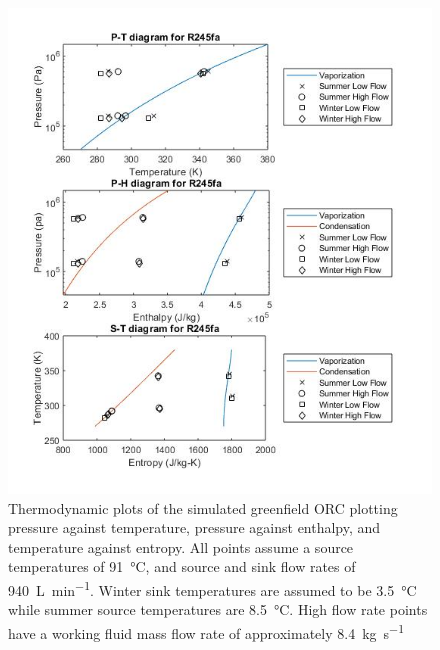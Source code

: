 \begin{figure}%
	\centering

	\includegraphics[width=\textwidth]{figures/GreenfieldThermoPlots}
	\caption{Thermodynamic plots of the simulated greenfield ORC plotting pressure against temperature, pressure against enthalpy, and temperature against entropy. All points assume a source temperatures of \SI{91}{\degreeCelsius}, and source and sink flow rates of \SI{940}{\liter\per\minute}. Winter sink temperatures are assumed to be \SI{3.5}{\degreeCelsius} while summer source temperatures are \SI{8.5}{\degreeCelsius}. High flow rate points have a working fluid mass flow rate of approximately \SI{8.4}{\kilogram\per\second}}
\label{fig:gf_themoplots}
\end{figure}